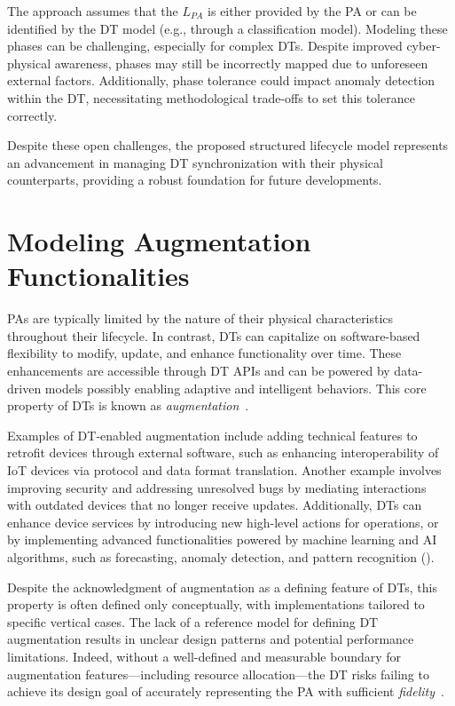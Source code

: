 The approach assumes that the $L_{PA}$ is either provided by the \ac{PA} or can be identified by the \ac{DT} model (e.g., through a classification model).
Modeling these phases can be challenging, especially for complex \acp{DT}.
Despite improved cyber-physical awareness, phases may still be incorrectly mapped due to unforeseen external factors.
Additionally, phase tolerance could impact anomaly detection within the DT, necessitating methodological trade-offs to set this tolerance correctly.

Despite these open challenges, the proposed structured lifecycle model represents an advancement in managing \ac{DT} synchronization with their physical counterparts, providing a robust foundation for future developments.

\section{Modeling Augmentation Functionalities}
\label{sec:dte:engineering-dt:dt-augmentation}

\acp{PA} are typically limited by the nature of their physical characteristics throughout their lifecycle. In contrast, \acp{DT} can capitalize on software-based flexibility to modify, update, and enhance functionality over time.
These enhancements are accessible through \ac{DT} \acp{API} and can be powered by data-driven models possibly enabling adaptive and intelligent behaviors.
This core property of \acp{DT} is known as \emph{augmentation}~\cite{dt-IoT-context-Minerva-2020}.

Examples of DT-enabled augmentation include adding technical features to retrofit devices through external software, such as enhancing interoperability of \ac{IoT} devices via protocol and data format translation. Another example involves improving security and addressing unresolved bugs by mediating interactions with outdated devices that no longer receive updates. Additionally, \acp{DT} can enhance device services by introducing new high-level actions for operations, or by implementing advanced functionalities powered by machine learning and \ac{AI} algorithms, such as forecasting, anomaly detection, and pattern recognition ().

Despite the acknowledgment of augmentation as a defining feature of \acp{DT},
this property is often defined only conceptually, with implementations tailored to specific vertical cases.
The lack of a reference model for defining \ac{DT} augmentation results in unclear design patterns and potential performance limitations.
Indeed, without a well-defined and measurable boundary for augmentation features---including resource allocation---the \ac{DT} risks failing to achieve its design goal of accurately representing the \ac{PA} with sufficient \emph{fidelity}~\cite{Bellavista_Bicocchi_Fogli_Giannelli_Mamei_Picone_2023}.

